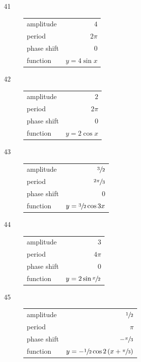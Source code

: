 \documentclass{exam}
\begin{document}
\begin{description}
    \item[41]
      \begin{tabular}[H]{lr}
        \toprule
        amplitude   & $4$ \\
        period      & $2 \pi$ \\
        phase shift & $0$ \\
        function    & $y = 4 \sin x$ \\
        \bottomrule
      \end{tabular}

    \item[42]
      \begin{tabular}[H]{lr}
        \toprule
        amplitude   & $2$ \\
        period      & $2 \pi$ \\
        phase shift & $0$ \\
        function    & $y = 2 \cos x$ \\
        \bottomrule
      \end{tabular}

    \item[43]
      \begin{tabular}[H]{lr}
        \toprule
        amplitude   & $\sfrac{3}{2}$ \\
        period      & $\sfrac{2 \pi}{3}$ \\
        phase shift & $0$ \\
        function    & $y = \sfrac{3}{2} \cos 3x$ \\
        \bottomrule
      \end{tabular}

    \item[44]
      \begin{tabular}[H]{lr}
        \toprule
        amplitude   & $3$ \\
        period      & $4 \pi$ \\
        phase shift & $0$ \\
        function    & $y = 2 \sin \sfrac{x}{2}$ \\
        \bottomrule
      \end{tabular}

    \item[45]
      \begin{tabular}[H]{lr}
        \toprule
        amplitude   & $\sfrac{1}{2}$ \\
        period      & $\pi$ \\
        phase shift & $- \sfrac{\pi}{3}$ \\
        function    & $y = - \sfrac{1}{2} \cos 2 \left( x + \sfrac{\pi}{3} \right)$ \\
        \bottomrule
      \end{tabular}


\end{description}
\end{document}

